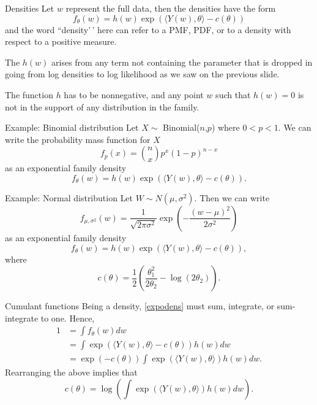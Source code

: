 \documentclass[
  ignorenonframetext,
]{beamer}
\begin{document}
\begin{frame}{Densities}
\protect\hypertarget{densities}{}
Let \(w\) represent the full data, then the densities have the form
\begin{equation} \label{expodens}
  f_\theta(w) = h(w)\exp\left(\langle Y(w),\theta\rangle - c(\theta)\right)
\end{equation} and the word ``density'\,' here can refer to a PMF, PDF,
or to a density with respect to a positive measure.

The \(h(w)\) arises from any term not containing the parameter that is
dropped in going from log densities to log likelihood as we saw on the
previous slide.

The function \(h\) has to be nonnegative, and any point \(w\) such that
\(h(w) = 0\) is not in the support of any distribution in the family.
\end{frame}

\begin{frame}{Example: Binomial distribution}
\protect\hypertarget{example-binomial-distribution-1}{}
Let \(X \sim\) Binomial(\(n\),\(p\)) where \(0 < p < 1\). We can write
the probability mass function for \(X\) \[
  f_p(x) = {n \choose x}p^x(1-p)^{n-x}
\] as an exponential family density \[
 f_{\theta}(w) = h(w)\exp\left( \langle Y(w),\theta \rangle - c(\theta)\right).
\]
\end{frame}

\begin{frame}{Example: Normal distribution}
\protect\hypertarget{example-normal-distribution}{}
Let \(W \sim N(\mu, \sigma^2)\). Then we can write \[
    f_{\mu,\sigma^2}(w) = \frac{1}{\sqrt{2\pi\sigma^2}}\exp\left(-\frac{(w-\mu)^2}{2\sigma^2}\right) 
\] as an exponential family density \[
 f_{\theta}(w) = h(w)\exp\left( \langle Y(w),\theta \rangle - c(\theta)\right),
\] where \[
  c(\theta) = \frac{1}{2}\left(\frac{\theta_1^2}{2\theta_2} - \log(2\theta_2)\right).
\]
\end{frame}

\begin{frame}{Cumulant functions}
\protect\hypertarget{cumulant-functions}{}
Being a density, \eqref{expodens} must sum, integrate, or sum-integrate
to one. Hence, \begin{align*}
    1 &= \int f_\theta(w) dw \\ 
      &= \int \exp\left(\langle Y(w),\theta\rangle - c(\theta)\right) h(w)dw \\
      &= \exp\left(-c(\theta)\right) \int \exp\left(\langle Y(w),\theta\rangle\right) h(w) dw.
\end{align*} Rearranging the above implies that \[
  c(\theta) = \log\left(\int \exp\left(\langle Y(w),\theta\rangle\right) h(w) dw\right).
\]
\end{frame}
\end{document}
